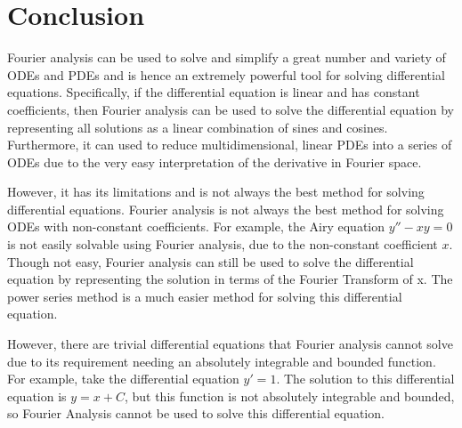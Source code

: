 \section{Conclusion}
\label{section:conclusion}
Fourier analysis can be used to solve and simplify a great number and variety of ODEs and PDEs and is hence an extremely powerful tool for solving differential equations.
Specifically, if the differential equation is linear and has constant coefficients, then Fourier analysis can be used to solve the differential equation by representing all solutions as a linear combination of sines and cosines.
Furthermore, it can used to reduce multidimensional, linear PDEs into a series of ODEs due to the very easy interpretation of the derivative in Fourier space.

However, it has its limitations and is not always the best method for solving differential equations.
Fourier analysis is not always the best method for solving ODEs with non-constant coefficients.
For example, the Airy equation $y'' - xy = 0$ is not easily solvable using Fourier analysis, due to the non-constant coefficient $x$.
Though not easy, Fourier analysis can still be used to solve the differential equation by representing the solution in terms of the Fourier Transform of x. 
The power series method is a much easier method for solving this differential equation.


However, there are trivial differential equations that Fourier analysis cannot solve due to its requirement needing an absolutely integrable and bounded function. 
For example, take the differential equation $y' = 1$. 
The solution to this differential equation is $y = x + C$, but this function is not absolutely integrable and bounded, so Fourier Analysis cannot be used to solve this differential equation.